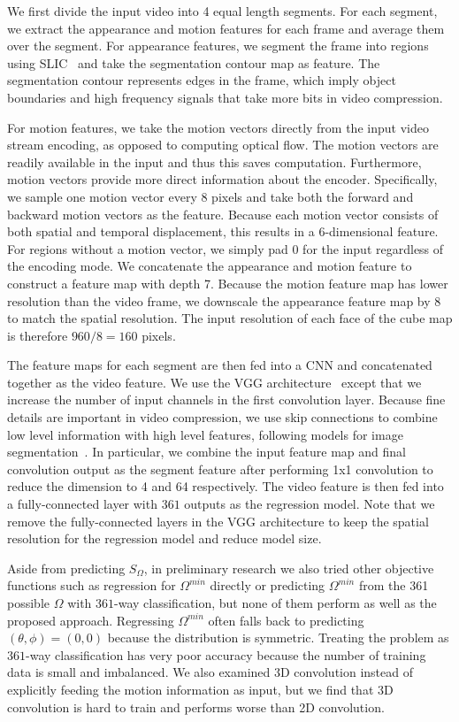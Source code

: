 \documentclass[journal,transmag]{IEEEtran}
\begin{document}
We first divide the input video into 4 equal length segments.
For each segment,
we extract the appearance and motion features for each frame and average them over the segment.
For appearance features,
we segment the frame into regions using SLIC~\cite{achanta2012slic} and take the segmentation contour map as feature.
The segmentation contour represents edges in the frame,
which imply object boundaries and high frequency signals that take more bits in video compression.

For motion features,
we take the motion vectors directly from the input video stream encoding, as opposed to computing optical flow. 
The motion vectors are readily available in the input and thus this saves computation.
Furthermore, motion vectors provide more direct information about the encoder.
Specifically,
we sample one motion vector every 8 pixels and take both the forward and backward motion vectors as the feature.
Because each motion vector consists of both spatial and temporal displacement,
this results in a 6-dimensional feature.
For regions without a motion vector, we simply pad 0 for the input regardless of the encoding mode.
We concatenate the appearance and motion feature to construct a feature map with depth 7.
Because the motion feature map has lower resolution than the video frame,
we downscale the appearance feature map by 8 to match the spatial resolution.
The input resolution of each face of the cube map is therefore $960/8=160$ pixels.

The feature maps for each segment are then fed into a CNN and concatenated together as the video feature.
We use the VGG architecture~\cite{simonyan2014very} except that we increase the number of input channels in the first convolution layer.
Because fine details are important in video compression,
we use skip connections to combine low level information with high level features, following models for image segmentation~\cite{long2015fully}.
In particular,
we combine the input feature map and final convolution output as the segment feature after performing 1x1 convolution to reduce the dimension to 4 and 64 respectively.
The video feature is then fed into a fully-connected layer with $361$ outputs as the regression model.
Note that we remove the fully-connected layers in the VGG architecture to keep the spatial resolution for the regression model and reduce model size.

Aside from predicting $S_{\Omega}$, in preliminary research 
we also tried other objective functions such as regression for $\Omega^{min}$ directly or predicting $\Omega^{min}$ from the 361 possible $\Omega$ with $361$-way classification,
but none of them perform as well as the proposed approach.
Regressing $\Omega^{min}$ often falls back to predicting $(\theta, \phi) = (0, 0)$ because the distribution is symmetric.
Treating the problem as $361$-way classification has very poor accuracy because the number of training data is small and imbalanced.
We also examined 3D convolution instead of explicitly feeding the motion information as input,
but we find that 3D convolution is hard to train and performs worse than 2D convolution.
\end{document}
